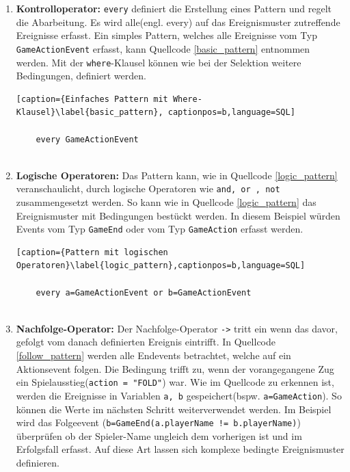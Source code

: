 \begin{enumerate}
	\item \textbf{Kontrolloperator:} \texttt{every} definiert die Erstellung eines Pattern und regelt die Abarbeitung. Es wird alle(engl. every) auf das Ereignismuster zutreffende Ereignisse erfasst. Ein simples Pattern, welches alle Ereignisse vom Typ \texttt{GameActionEvent} erfasst, kann Quellcode \ref{basic_pattern} entnommen werden.
	Mit der \texttt{where}-Klausel können wie bei der Selektion weitere Bedingungen, definiert werden.
	
	\begin{lstlisting}[caption={Einfaches Pattern mit Where-Klausel}\label{basic_pattern}, captionpos=b,language=SQL]
	
	every GameActionEvent
	
	\end{lstlisting}
	
	\item \textbf{Logische Operatoren:} 
	Das Pattern kann, wie in Quellcode \ref{logic_pattern} veranschaulicht, durch logische Operatoren wie \texttt{and, or , not} zusammengesetzt werden. So kann wie in Quellcode \ref{logic_pattern} das Ereignismuster mit Bedingungen bestückt werden. In diesem Beispiel würden Events vom Typ \texttt{GameEnd} oder vom Typ \texttt{GameAction} erfasst werden.
	
	\begin{lstlisting}[caption={Pattern mit logischen Operatoren}\label{logic_pattern},captionpos=b,language=SQL]
	
	every a=GameActionEvent or b=GameActionEvent
	
	\end{lstlisting}
	
	\item \textbf{Nachfolge-Operator:}
	Der Nachfolge-Operator \texttt{->} tritt ein wenn das davor, gefolgt vom danach definierten Ereignis eintrifft. In Quellcode \ref{follow_pattern}  werden alle Endevents betrachtet, welche auf ein Aktionsevent folgen. Die Bedingung trifft zu, wenn der vorangegangene Zug ein Spielausstieg(\texttt{action = "FOLD"}) war.
	Wie im Quellcode zu erkennen ist, werden die Ereignisse in Variablen \texttt{a, b} gespeichert(bspw. \texttt{a=GameAction}). So können die Werte im nächsten Schritt weiterverwendet werden. Im Beispiel wird das Folgeevent (\texttt{b=GameEnd(a.playerName != b.playerName)}) überprüfen ob der Spieler-Name ungleich dem vorherigen ist und im Erfolgsfall erfasst. Auf diese Art lassen sich komplexe bedingte Ereignismuster definieren.
	

\end{enumerate}
